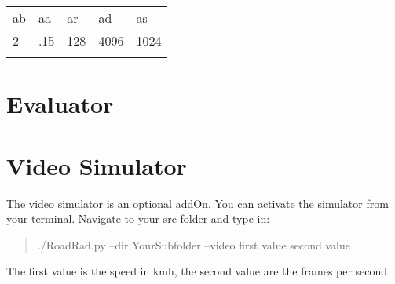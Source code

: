 \documentclass[10pt,a4paper]{report}
\newcommand{\mytoprule}{\specialrule{0.2em}{0em}{0em}}
\newcommand{\mymidrule}{\specialrule{0.1em}{0em}{0em}}
\newcommand{\mybottomrule}{\specialrule{0.2em}{0em}{0em}}
\begin{document}
\renewcommand{\arraystretch}{1.5}
	\begin{longtable}{p{3cm}p{3cm}p{3cm}p{3cm}p{3cm}}
		\mytoprule
		\rowcolor{dunkelgrau}
			ab & aa & ar & ad & as \\
		\mymidrule
			2 & .15 & 128 & 4096 & 1024 \\
		\mybottomrule
	\end{longtable} 

\section{Evaluator}

\section{Video Simulator}
The video simulator is an optional addOn. You can activate the simulator from your terminal. Navigate to your src-folder and type in:

\begin{quote}
./RoadRad.py --dir YourSubfolder --video first value second value
\end{quote} 
The first value is the speed in kmh, the second value are the frames per second
\end{document}
